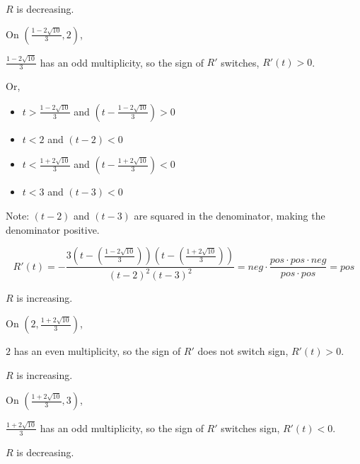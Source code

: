 \documentclass{ximera}
\begin{document}
$R$ is decreasing. 













On $\left( \frac{1 - 2 \sqrt{10}}{3}, 2 \right)$, 


$\frac{1 - 2 \sqrt{10}}{3}$ has an odd multiplicity, so the sign of $R'$ switches, $R'(t) > 0$. 




Or, 




\begin{itemize}
\item $t > \frac{1 - 2 \sqrt{10}}{3}$ and $\left( t - \frac{1 - 2 \sqrt{10}}{3} \right) > 0$
\item $t < 2$ and $(t - 2) < 0$
\item $t < \frac{1 + 2 \sqrt{10}}{3}$ and $\left( t - \frac{1 + 2 \sqrt{10}}{3} \right) < 0$
\item $t < 3$ and $(t - 3) < 0$
\end{itemize}

Note: $(t-2)$ and $(t-3)$ are squared in the denominator, making the denominator positive. 



\[   
R'(t) = -\frac{3 \left(t - \left(\frac{1 - 2 \sqrt{10}}{3} \right) \right) \left(t - \left(\frac{1 + 2 \sqrt{10}}{3} \right) \right) }{ (t-2)^2 (t-3)^2 }  = neg \cdot \frac{pos \cdot pos \cdot neg}{pos \cdot pos} = pos
\]


$R$ is increasing. 











On $\left( 2, \frac{1 + 2 \sqrt{10}}{3} \right)$, 


$2$ has an even multiplicity, so the sign of $R'$ does not switch sign, $R'(t) > 0$. 


$R$ is increasing. 






On $\left( \frac{1 + 2 \sqrt{10}}{3}, 3 \right)$, 


$\frac{1 + 2 \sqrt{10}}{3}$ has an odd multiplicity, so the sign of $R'$ switches sign, $R'(t) < 0$. 


$R$ is decreasing. 
\end{document}
